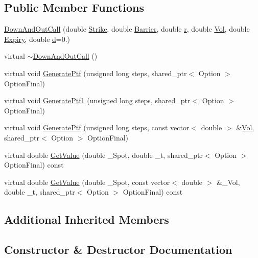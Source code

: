 \subsection*{Public Member Functions}
\begin{DoxyCompactItemize}
\item 
\hyperlink{classDownAndOutCall_a61cebb82065fba33c51db0a3075a40d8}{Down\+And\+Out\+Call} (double \hyperlink{classOptionToReplicate_a64ffcbc25fc60c5dc18ca4b78194ca89}{Strike}, double \hyperlink{classOptionToReplicate_a7cd35379de855ad6e53008fbf7e9dda0}{Barrier}, double \hyperlink{classOptionToReplicate_ad344ef3a4a4e93372c390c60420d1a61}{r}, double \hyperlink{classOptionToReplicate_a3a28b1ab0cd1ee635b3c31998bd2c572}{Vol}, double \hyperlink{classOptionToReplicate_a62014eac88a2a766ed674be69e9fd926}{Expiry}, double \hyperlink{classOptionToReplicate_aa088a512c974dc622ca1bbca61ec5e34}{d}=0.)
\item 
virtual \hyperlink{classDownAndOutCall_a01a5a9897ef41a37c569187b6c263afb}{$\sim$\+Down\+And\+Out\+Call} ()
\item 
virtual void \hyperlink{classDownAndOutCall_a378b557d728ed157db9d41ef39bb8abf}{Generate\+Ptf} (unsigned long steps, shared\+\_\+ptr$<$ Option $>$ Option\+Final)
\item 
virtual void \hyperlink{classDownAndOutCall_a0b8b44b58822b7c4f75e2436b9cf69d7}{Generate\+Ptf1} (unsigned long steps, shared\+\_\+ptr$<$ Option $>$ Option\+Final)
\item 
virtual void \hyperlink{classDownAndOutCall_a7f4f73437c1e61cc57f96fadd05a7df1}{Generate\+Ptf} (unsigned long steps, const vector$<$ double $>$ \&\hyperlink{classOptionToReplicate_a3a28b1ab0cd1ee635b3c31998bd2c572}{Vol}, shared\+\_\+ptr$<$ Option $>$ Option\+Final)
\item 
virtual double \hyperlink{classDownAndOutCall_ab5855704cc4680238596427a115cb3e1}{Get\+Value} (double \+\_\+\+Spot, double \+\_\+t, shared\+\_\+ptr$<$ Option $>$ Option\+Final) const
\item 
virtual double \hyperlink{classDownAndOutCall_a6ccfc2e5d77a48558087d4b9df914377}{Get\+Value} (double \+\_\+\+Spot, const vector$<$ double $>$ \&\+\_\+\+Vol, double \+\_\+t, shared\+\_\+ptr$<$ Option $>$ Option\+Final) const
\end{DoxyCompactItemize}
\subsection*{Additional Inherited Members}


\subsection{Constructor \& Destructor Documentation}
\hypertarget{classDownAndOutCall_a61cebb82065fba33c51db0a3075a40d8}{}\label{classDownAndOutCall_a61cebb82065fba33c51db0a3075a40d8} 
